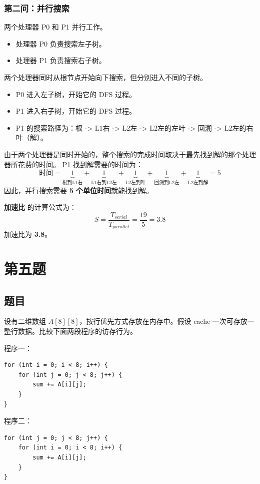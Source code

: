 \subsection{第二问：并行搜索}
两个处理器 P0 和 P1 并行工作。
\begin{itemize}
    \item 处理器 P0 负责搜索左子树。
    \item 处理器 P1 负责搜索右子树。
\end{itemize}
两个处理器同时从根节点开始向下搜索，但分别进入不同的子树。
\begin{itemize}
    \item P0 进入左子树，开始它的 DFS 过程。
    \item P1 进入右子树，开始它的 DFS 过程。
    \item P1 的搜索路径为：根 -> L1右 -> L2左 -> L2左的左叶 -> 回溯 -> L2左的右叶（解）。
\end{itemize}
由于两个处理器是同时开始的，整个搜索的完成时间取决于最先找到解的那个处理器所花费的时间。
P1 找到解需要的时间为：
$$ \text{时间} = \underbrace{1}_{\text{根到L1右}} + \underbrace{1}_{\text{L1右到L2左}} + \underbrace{1}_{\text{L2左到叶}} + \underbrace{1}_{\text{回溯到L2左}} + \underbrace{1}_{\text{L2左到解}} = 5 $$
因此，并行搜索需要 \textbf{5 个单位时间}就能找到解。

\textbf{加速比} 的计算公式为：
$$ S = \frac{T_{serial}}{T_{parallel}} = \frac{19}{5} = 3.8 $$
加速比为 \textbf{3.8}。

\chapter{第五题}

\section{题目}

设有二维数组 $A[8][8]$，按行优先方式存放在内存中。假设 cache 一次可存放一整行数据。比较下面两段程序的访存行为。

程序一：
\begin{lstlisting}[style=cleancpp]
for (int i = 0; i < 8; i++) {
    for (int j = 0; j < 8; j++) {
        sum += A[i][j];
    }
}
\end{lstlisting}

程序二：
\begin{lstlisting}[style=cleancpp]
for (int j = 0; j < 8; j++) {
    for (int i = 0; i < 8; i++) {
        sum += A[i][j];
    }
}

\end{lstlisting}

